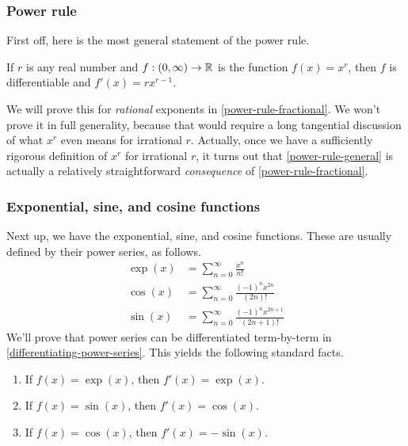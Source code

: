 \subsubsection*{Power rule}

First off, here is the most general statement of the power rule.

\begin{proposition} \label{power-rule-general} 
	If $r$ is any real number and $f : (0, \infty) \to \mathbb{R}$ is the function $f(x) = x^r$, then $f$ is differentiable and $f'(x) = rx^{r-1}$. 
\end{proposition}

We will prove this for \emph{rational} exponents in \cref{power-rule-fractional}. We won't prove it in full generality, because that would require a long tangential discussion of what $x^r$ even means for irrational $r$. Actually, once we have a sufficiently rigorous definition of $x^r$ for irrational $r$, it turns out that \cref{power-rule-general} is actually a relatively straightforward \emph{consequence} of \cref{power-rule-fractional}. 

\subsubsection*{Exponential, sine, and cosine functions}

Next up, we have the exponential, sine, and cosine functions. These are usually defined by their power series, as follows. 
\begin{equation} \label{exp-sin-cos-power-series} \begin{aligned} \exp(x) &= \sum_{n = 0}^\infty \frac{x^n}{n!} \\
\cos(x) &= \sum_{n = 0}^\infty \frac{(-1)^n x^{2n}}{(2n)!} \\
\sin(x) &= \sum_{n = 0}^\infty \frac{(-1)^n x^{2n+1}}{(2n+1)!} \end{aligned} \end{equation}
We'll prove that power series can be differentiated term-by-term in \cref{differentiating-power-series}. This yields the following standard facts. 
\begin{enumerate}[(1)]
	\item If $f(x) = \exp(x)$, then $f'(x) = \exp(x)$. 
	\item If $f(x) = \sin(x)$, then $f'(x) = \cos(x)$. 
	\item If $f(x) = \cos(x)$, then $f'(x) = -\sin(x)$.
\end{enumerate} 

